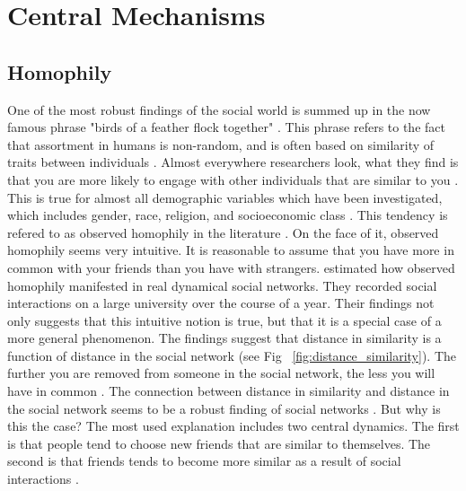 \documentclass{article}
\begin{document}
\section{Central Mechanisms}
\subsection{Homophily}
One of the most robust findings of the social world is summed up in the now famous phrase "birds of a feather flock together" \cite{mcpherson_birds_2001}. This phrase refers to the fact that assortment in humans is non-random, and is often based on similarity of traits between individuals \cite{asikainen_cumulative_2020,crandall_feedback_2008,mcpherson_birds_2001}. Almost everywhere researchers look, what they find is that you are more likely to engage with other individuals that are similar to you \cite{taylor_exploring_2018}. This is true for almost all demographic variables which have been investigated, which includes gender, race, religion, and socioeconomic class \cite{asikainen_cumulative_2020,mcpherson_birds_2001}. 
This tendency is refered to as observed homophily in the literature \cite{kossinets_origins_2009,mcpherson_birds_2001}. On the face of it, observed homophily seems very intuitive. It is reasonable to assume that you have more in common with your friends than you have with strangers. 
\citeauthor{kossinets_origins_2009} \citeyear{kossinets_origins_2009} estimated how observed homophily manifested in real dynamical social networks. They recorded social interactions on a large university over the course of a year. Their findings not only suggests that this intuitive notion is true, but that it is a special case of a more general phenomenon. The findings suggest that distance in similarity is a function of distance in the social network (see Fig ~\ref{fig:distance_similarity}). The further you are removed from someone in the social network, the less you will have in common \cite{kossinets_origins_2009}. The connection between distance in similarity and distance in the social network seems to be a robust finding of social networks \cite{bener_empirical_2016,crandall_feedback_2008}.
But why is this the case? The most used explanation includes two central dynamics. The first is that people tend to choose new friends that are similar to themselves. The second is that friends tends to become more similar as a result of social interactions \cite{crandall_feedback_2008}. 
\end{document}
